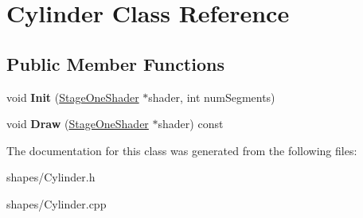 \hypertarget{classCylinder}{\section{\-Cylinder \-Class \-Reference}
\label{classCylinder}
}
\subsection*{\-Public \-Member \-Functions}
\begin{DoxyCompactItemize}
\item 
\hypertarget{classCylinder_a5b973d84211110771ca06e8ee1527a0a}{void {\bfseries \-Init} (\hyperlink{classStageOneShader}{\-Stage\-One\-Shader} $\ast$shader, int num\-Segments)}\label{classCylinder_a5b973d84211110771ca06e8ee1527a0a}

\item 
\hypertarget{classCylinder_a712a1b1209889baea0d0d6e06f5be70e}{void {\bfseries \-Draw} (\hyperlink{classStageOneShader}{\-Stage\-One\-Shader} $\ast$shader) const }\label{classCylinder_a712a1b1209889baea0d0d6e06f5be70e}

\end{DoxyCompactItemize}


\-The documentation for this class was generated from the following files\-:\begin{DoxyCompactItemize}
\item 
shapes/\-Cylinder.\-h\item 
shapes/\-Cylinder.\-cpp\end{DoxyCompactItemize}
